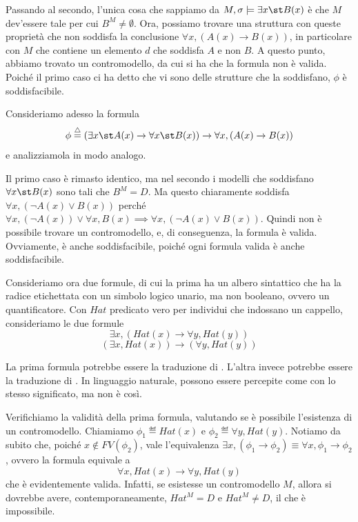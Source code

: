 Passando al secondo, l'unica cosa che sappiamo da \(M,\sigma\models \exists x\st B(x)\) è che \(M\) dev'essere tale per cui \(B^M \neq \emptyset\). Ora, possiamo trovare una struttura con queste proprietà che non soddisfa la conclusione \(\forall x, (A(x)\to B(x))\), in particolare con \(M\) che contiene un elemento \(d\) che soddisfa \(A\) e non \(B\). A questo punto, abbiamo trovato un contromodello, da cui si ha che la formula non è valida. Poiché il primo caso ci ha detto che vi sono delle strutture che la soddisfano, \(\phi\) è soddisfacibile.

Consideriamo adesso la formula 
\[\phi \eqdef (\exists x\st A(x)\to \forall x\st B(x))\to \forall x, (A(x)\to B(x))\]
e analizziamola in modo analogo.

Il primo caso è rimasto identico, ma nel secondo i modelli che soddisfano \(\forall x\st B(x)\) sono tali che \(B^M = D\). Ma questo chiaramente soddisfa \(\forall x, (\neg A(x)\lor B(x))\) perché \(\forall x, (\neg A(x)) \lor \forall x, B(x) \implies \forall x, (\neg A(x)\lor B(x))\). Quindi non è possibile trovare un contromodello, e, di conseguenza, la formula è valida. Ovviamente, è anche soddisfacibile, poiché ogni formula valida è anche soddisfacibile.

Consideriamo ora due formule, di cui la prima ha un albero sintattico che ha la radice etichettata con un simbolo logico unario, ma non booleano, ovvero un quantificatore.
Con \(Hat\) predicato vero per individui che indossano un cappello, consideriamo le due formule
\[\exists x, (Hat(x) \to \forall y, Hat(y))\]
\[(\exists x, Hat(x))\to(\forall y, Hat(y))\]

La prima formula potrebbe essere la traduzione di . L'altra invece potrebbe essere la traduzione di . In linguaggio naturale, possono essere percepite come con lo stesso significato, ma non è così. 

Verifichiamo la validità della prima formula, valutando se è possibile l'esistenza di un contromodello. Chiamiamo \(\phi_1 \eqdef Hat(x)\) e \(\phi_2 \eqdef \forall y, Hat(y)\). Notiamo da subito che, poiché \(x \notin FV(\phi_2)\), vale l'equivalenza \(\exists x, (\phi_1 \to \phi_2) \equiv \forall x, \phi_1 \to \phi_2\), ovvero la formula equivale a
\[\forall x, Hat(x) \to \forall y, Hat(y)\]
che è evidentemente valida. Infatti, se esistesse un contromodello \(M\), allora si dovrebbe avere, contemporaneamente, \(Hat^M = D\) e \(Hat^M \neq D\), il che è impossibile.

